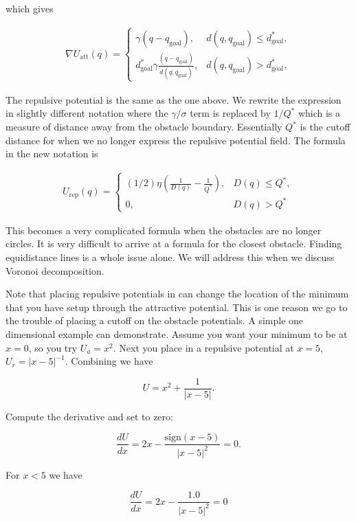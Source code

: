 which gives

\[\begin{aligned}
\nabla U_\text{att}(q) = \left\{ \begin{array}{ll} \gamma (q -q_\text{goal}), & d(q, q_\text{goal})\leq d^*_\text{goal},\\[3mm]
d^*_\text{goal}\gamma \frac{(q -q_\text{goal})}{d(q, q_\text{goal})}, & d(q, q_\text{goal})> d^*_\text{goal},
\end{array}\right.
\end{aligned}\]

The repulsive potential is the same as the one above. We rewrite the
expression in slightly different notation where the \(\gamma/\sigma\)
term is replaced by \(1/Q^*\) which is a measure of distance away from
the obstacle boundary. Essentially \(Q^*\) is the cutoff distance for
when we no longer express the repulsive potential field. The formula in
the new notation is

\[\begin{aligned}
U_\text{rep}(q) = \left\{ \begin{array}{ll} (1/2)\eta \left( \frac{1}{D(q)} - \frac{1}{Q^*}\right) , &
D(q) \leq Q^*,\\[3mm]
0, & D(q) > Q^*
\end{array}\right.
\end{aligned}\]

This becomes a very complicated formula when the obstacles are no longer
circles. It is very difficult to arrive at a formula for the closest
obstacle. Finding equidistance lines is a whole issue alone. We will
address this when we discuss Voronoi decomposition.

Note that placing repulsive potentials in can change the location of the
minimum that you have setup through the attractive potential. This is
one reason we go to the trouble of placing a cutoff on the obstacle
potentials. A simple one dimensional example can demonstrate. Assume you
want your minimum to be at \(x=0\), so you try \(U_a = x^2\). Next you
place in a repulsive potential at \(x=5\), \(U_r = |x - 5|^{-1}\).
Combining we have

\[U = x^2 + \frac{1}{|x - 5|}.\]

Compute the derivative and set to zero:

\[\frac{dU}{dx} = 2x - \frac{\mbox{sign}(x-5)}{|x - 5|^2} = 0.\]

For \(x<5\) we have

\[\frac{dU}{dx} = 2x - \frac{1.0}{|x - 5|^2} = 0\]

